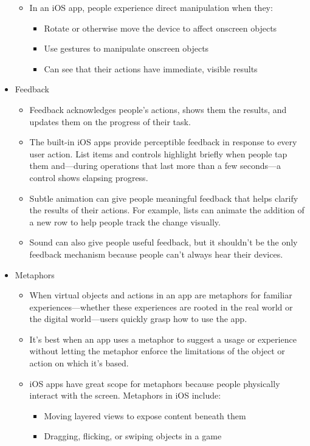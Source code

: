 \begin{itemize}
\begin{itemize}
	\newpage
	\item In an iOS app, people experience direct manipulation when they: 
		\begin{itemize}
		\item Rotate or otherwise move the device to affect onscreen objects 
		\item Use gestures to manipulate onscreen objects 
		\item Can see that their actions have immediate, visible results 
		\end{itemize}
	\end{itemize}
\item Feedback
	\begin{itemize}
	\item Feedback acknowledges people’s actions, shows them the results, and updates them on the progress of their task. 
	\item  The built-in iOS apps provide perceptible feedback in response to every user action. List items and controls highlight briefly when people tap them and—during operations that last more than a few seconds—a control shows elapsing progress.
	\item Subtle animation can give people meaningful feedback that helps clarify the results of their actions. For example, lists can animate the addition of a new row to help people track the change visually.
	\item Sound can also give people useful feedback, but it shouldn’t be the only feedback mechanism because people can’t always hear their devices. 
	\end{itemize}
\item Metaphors
	\begin{itemize}
	\item  When virtual objects and actions in an app are metaphors for familiar experiences—whether these experiences are rooted in the real world or the digital world—users quickly grasp how to use the app.
	\item It’s best when an app uses a metaphor to suggest a usage or experience without letting the metaphor enforce the limitations of the object or action on which it’s based.
	\item iOS apps have great scope for metaphors because people physically interact with the screen. Metaphors in iOS include: 
		\begin{itemize}
		\item Moving layered views to expose content beneath them
		\item Dragging, flicking, or swiping objects in a game

\end{itemize}
\end{itemize}
\end{itemize}
